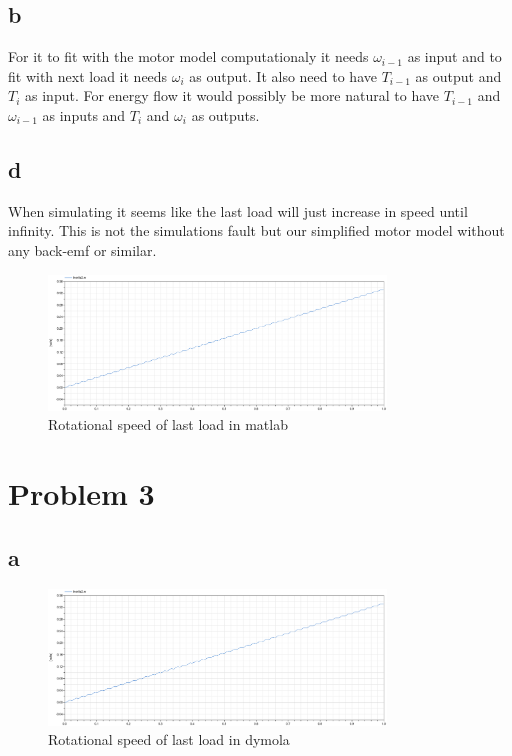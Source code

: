\documentclass[11pt]{article}
\begin{document}
\subsection*{b}
For it to fit with the motor model computationaly it needs $\omega_{i-1}$ as input and to fit with next load it needs $\omega_{i}$ as output. It also need to have $T_{i-1}$ as output and $T_i$ as input. For energy flow it would possibly be more natural to have $T_{i-1}$ and $\omega_{i-1}$ as inputs and $T_i$ and $\omega_i$ as outputs.

\subsection*{d}
When simulating it seems like the last load will just increase in speed until infinity. This is not the simulations fault but our simplified motor model without any back-emf or similar.
\begin{figure}[H]
\centering
\includegraphics[width=0.8\textwidth]{DymolaRotationalSpeed.eps}
\caption{Rotational speed of last load in matlab}
\end{figure}



\section*{Problem 3}
\subsection*{a}
\begin{figure}[H]
\centering
\includegraphics[width=0.8\textwidth]{DymolaRotationalSpeed.eps}
\caption{Rotational speed of last load in dymola}
\end{figure}
\end{document}
